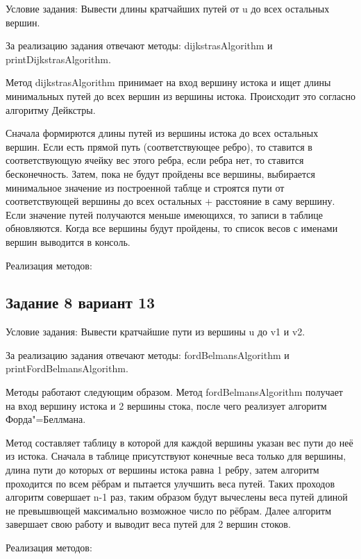 \documentclass[bachelor, och, pract]{SCWorks}
\begin{document}
Условие задания: Вывести длины кратчайших путей от u до всех остальных вершин.
\bigskip

За реализацию задания отвечают методы: dijkstrasAlgorithm и printDijkstrasAlgorithm.
\bigskip

Метод dijkstrasAlgorithm принимает на вход вершину истока и ищет длины минимальных
путей до всех вершин из вершины истока. Происходит это согласно алгоритму Дейкстры.

Сначала формирются длины путей из вершины истока до всех остальных вершин. Если
есть прямой путь (соответствующее ребро), то ставится в соответствующую ячейку
вес этого ребра, если ребра нет, то ставится бесконечность. Затем,
пока не будут пройдены все вершины, выбирается минимальное значение из построенной
таблце и строятся пути от соответствующей вершины до всех остальных +
расстояние в саму вершину. Если значение путей получаются меньше имеющихся, то
записи в таблице обновляются. Когда все вершины будут пройдены, то
список весов с именами вершин выводится в консоль.
\bigskip

Реализация методов:
\bigskip


\bigskip

\subsection{Задание 8 вариант 13}

Условие задания: Вывести кратчайшие пути из вершины u до v1 и v2.
\bigskip

За реализацию задания отвечают методы: fordBelmansAlgorithm и printFordBelmansAlgorithm.
\bigskip

Методы работают следующим образом. Метод fordBelmansAlgorithm получает на вход
вершину истока и 2 вершины стока, после чего реализует алгоритм Форда"=Беллмана.

Метод составляет таблицу в которой для каждой вершины указан вес пути до неё из
истока. Сначала в таблице присутствуют конечные веса только для вершины, длина
пути до которых от вершины истока равна 1 ребру, затем алгоритм проходится по всем рёбрам и пытается
улучшить веса путей. Таких проходов алгоритм совершает n-1 раз, таким образом будут вычеслены веса путей
длиной не превышвющей максимально возможное число по рёбрам. Далее алгоритм завершает свою работу и выводит
веса путей для 2 вершин стоков.
\bigskip

Реализация методов:
\bigskip


\bigskip
\end{document}
